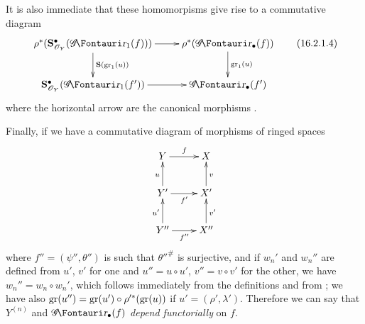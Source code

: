 \begin{env}[16.2.1]
It is also immediate that these homomorpisms give rise to a commutative diagram
\[
  \label{IV.16.2.1.4}
  \xymatrix{
    \rho^*(\bb{S}_{\sh{O}_Y}^\bullet(\shGr_1(f)) ) \ar[r] \ar[d]^-{\bb{S}(\gr_1(u))} & \rho^*(\shGr_\bullet(f)) \ar[d]^-{\gr_1(u)}\\
    \bb{S}_{\sh{O}_Y}^\bullet(\shGr_1(f')) \ar[r] & \shGr_\bullet(f')
  }
  \tag{16.2.1.4}
\]
where the horizontal arrow are the canonical morphisms .

Finally, if we have a commutative diagram of morphisms of ringed spaces
\[
  \xymatrix{
    Y \ar[r]^{f} & X \\
    Y' \ar[r]_{f'} \ar[u]^u & X' \ar[u]_v\\
    Y'' \ar[r]_{f''} \ar[u]^{u'} & X'' \ar[u]_{v'}\\
  }
\]
where $f'' = (\psi'', \theta'')$ is such that $\theta''^\#$ is surjective, and if $w_n'$ and $w_n''$ are defined from $u'$, $v'$ for one and $u'' = u \circ u'$, $v'' = v \circ v'$ for the other, we have $w_n'' = w_n \circ w_n'$, which follows immediately from the definitions and from ;
we have also $\operatorname{gr}(u'') = \operatorname{gr}(u') \circ \rho'^*(\operatorname{gr}(u))$ if $u' = (\rho', \lambda')$.
Therefore we can say that $Y^{(n)}$ and $\shGr_\bullet(f)$ \emph{depend functorially} on $f$. 
\end{env}

